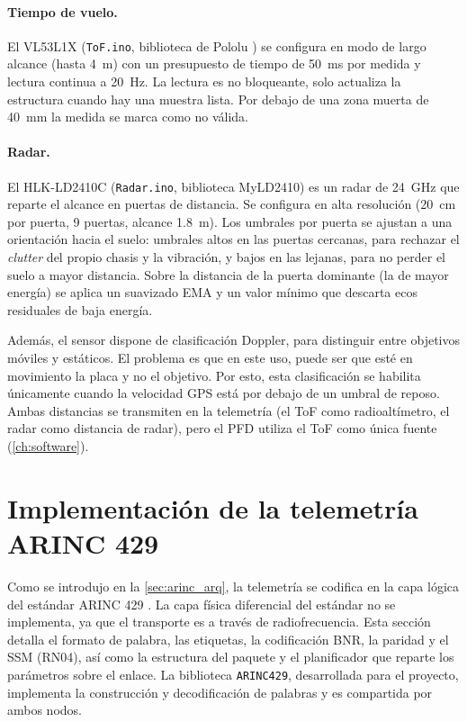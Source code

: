 \paragraph{Tiempo de vuelo.}
El VL53L1X (\texttt{ToF.ino}, biblioteca de Pololu \cite{lib_vl53l1x}) se
configura en modo de largo alcance (hasta \SI{4}{\meter}) con un presupuesto
de tiempo de \SI{50}{\milli\second} por medida y lectura continua a
\SI{20}{\hertz}. La lectura es no bloqueante, solo actualiza la estructura cuando
hay una muestra lista. Por debajo de una zona muerta de \SI{40}{\milli\meter} la
medida se marca como no válida.

\paragraph{Radar.}
El HLK-LD2410C (\texttt{Radar.ino}, biblioteca MyLD2410) es un radar de
\SI{24}{\giga\hertz} que reparte el alcance en puertas de distancia. Se
configura en alta resolución (\SI{20}{\centi\meter} por puerta, 9 puertas,
alcance \SI{1.8}{\meter}). Los
umbrales por puerta se ajustan a una orientación hacia el suelo: umbrales altos
en las puertas cercanas, para rechazar el \textit{clutter} del propio chasis y
la vibración, y bajos en las lejanas, para no perder el suelo a mayor distancia.
Sobre la distancia de la puerta dominante (la de mayor energía) se aplica un
suavizado EMA y un valor mínimo que descarta ecos residuales de baja energía.

Además, el sensor dispone de clasificación Doppler, para distinguir entre objetivos móviles y estáticos. El problema es que en este uso, puede ser que esté en movimiento la placa y no el objetivo. Por esto, esta clasificación se habilita únicamente
cuando la velocidad GPS está por debajo de un umbral de reposo. Ambas distancias
se transmiten en la telemetría (el ToF como radioaltímetro, el radar como
distancia de radar), pero el PFD utiliza el ToF como única fuente 
(\cref{ch:software}).


\section{Implementación de la telemetría ARINC 429}
\label{sec:arinc_hw}

Como se introdujo en la \cref{sec:arinc_arq}, la telemetría se codifica en la
capa lógica del estándar ARINC 429 \cite{arinc429}. La capa física diferencial
del estándar no se implementa, ya que el transporte es a través de radiofrecuencia. Esta
sección detalla el formato de palabra, las etiquetas, la codificación BNR, la
paridad y el SSM (RN04), así como la estructura del paquete y el planificador que
reparte los parámetros sobre el enlace. La biblioteca \texttt{ARINC429},
desarrollada para el proyecto, implementa la construcción y decodificación de
palabras y es compartida por ambos nodos.

